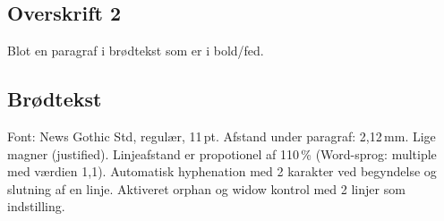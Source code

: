 \documentclass[danmark]{UNF}
\begin{document}
\subsection{Overskrift 2}
Blot en paragraf i brødtekst som er i bold/fed.

\subsection{Brødtekst}
Font: News Gothic Std, regulær, 11\,pt. Afstand under paragraf: 2,12\,mm. Lige magner (justified). Linjeafstand er propotionel af 110\,\% (Word-sprog: multiple med værdien 1,1). Automatisk hyphenation med 2 karakter ved begyndelse og slutning af en linje. Aktiveret orphan og widow kontrol med 2 linjer som indstilling.
\end{document}

